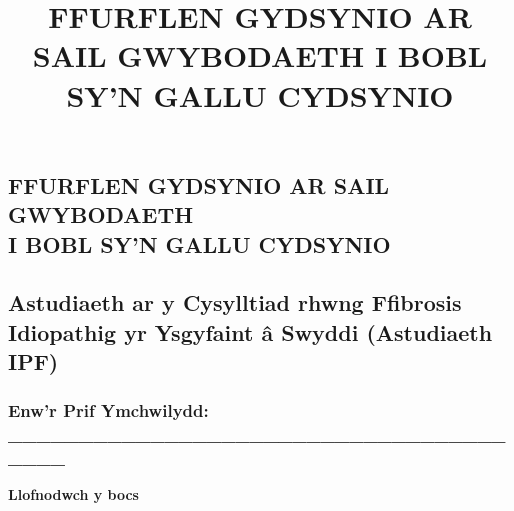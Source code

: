 \documentclass[a4paper,10pt]{article}
\begin{document}
 \newpage\title{\bf FFURFLEN GYDSYNIO AR SAIL GWYBODAETH I  BOBL SY'N GALLU CYDSYNIO}
 \date{}
 
 
 \pagestyle{fancy}
 
 
 \begin{centering} 
 \section*{FFURFLEN GYDSYNIO AR SAIL GWYBODAETH\\ I BOBL SY'N GALLU CYDSYNIO}
 \end{centering}
 \subsection*{Astudiaeth ar y Cysylltiad rhwng Ffibrosis Idiopathig yr Ysgyfaint \^{a} Swyddi (Astudiaeth IPF)}

 \vspace{0.2cm}

 \subsubsection*{Enw'r Prif Ymchwilydd: \_\_\_\_\_\_\_\_\_\_\_\_\_\_\_\_\_\_\_\_\_\_\_\_\_\_\_\_\_\_\_\_\_\_\_\_\_\_\_}

 \vspace{0.5cm}

 \hfill \textbf{Llofnodwch y bocs}
\end{document}

